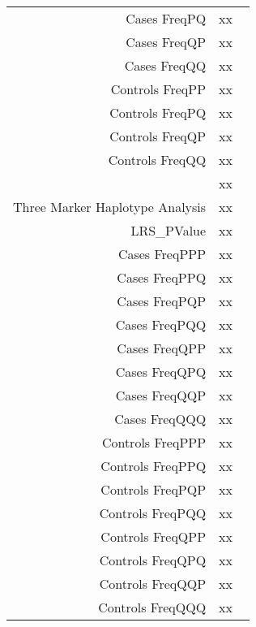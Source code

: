 \begin{supertabular}{r p{5in}}
    Cases FreqPQ  & xx  \\
    Cases FreqQP  & xx  \\
    Cases FreqQQ  & xx  \\
    Controls FreqPP  & xx  \\
    Controls FreqPQ  & xx  \\
    Controls FreqQP  & xx  \\
    Controls FreqQQ  & xx  \\
  ~ & xx ~ \\
  Three Marker Haplotype Analysis & xx ~ \\
    LRS\_PValue  & xx  \\
    Cases FreqPPP  & xx  \\
    Cases FreqPPQ  & xx  \\
    Cases FreqPQP  & xx  \\
    Cases FreqPQQ  & xx  \\
    Cases FreqQPP  & xx  \\
    Cases FreqQPQ  & xx  \\
    Cases FreqQQP  & xx  \\
    Cases FreqQQQ  & xx  \\
    Controls FreqPPP  & xx  \\
    Controls FreqPPQ  & xx  \\
    Controls FreqPQP  & xx  \\
    Controls FreqPQQ  & xx  \\
    Controls FreqQPP  & xx  \\
    Controls FreqQPQ  & xx  \\
    Controls FreqQQP  & xx  \\
    Controls FreqQQQ  & xx  \\
\end{supertabular} 
